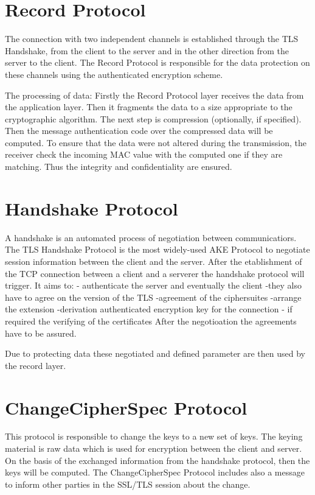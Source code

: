 \section{Record Protocol}
\label{sec:record_protocol}

The connection with two independent channels is established through the TLS Handshake, from the client to the server and in the other direction from the server to the client. The Record Protocol is responsible for the data protection on these channels using the authenticated encryption scheme.

The processing of data:              
Firstly the Record Protocol layer receives the data from the application layer. Then it fragments the data to a size appropriate to the cryptographic algorithm. 
The next step is compression (optionally, if specified). Then the message authentication code over the compressed data will be computed.
To ensure that the data were not altered during the transmission, the receiver check the incoming MAC value with the computed one if they are matching. Thus the integrity and confidentiality are ensured.
\cite{ms:Record}

\section{Handshake Protocol}
\label{sec:handshake_protocol}
 A handshake is an automated process of negotiation between communicatiors. The TLS Handshake Protocol is the most widely-used  AKE Protocol to negotiate session information between the client and the server. 
 After the etablishment of the TCP connection between a client and a serverer the handshake protocol will trigger. It aims to:  - authenticate the server and eventually the client
 -they also have to agree on the version of the TLS
 -agreement of the ciphersuites
 -arrange the extension
 -derivation authenticated encryption key for the connection
- if required the verifying of the certificates
 After the negotioation the agreements have to be assured.

Due to protecting data these negotiated and defined parameter are then used by the record layer.

\cite{ms:overview}
\cite{ms:handshake}

\section{ChangeCipherSpec Protocol}
\label{sec:changeciphfer_protocol}
This protocol is responsible to change the keys to a new set of keys. 
The keying material is raw data which is used for encryption between the client and server. On the basis of the exchanged information from the handshake protocol, then the keys will be computed.
The ChangeCipherSpec Protocol includes also a message to inform other parties in the SSL/TLS session about the change.   \cite{ms:overview}


